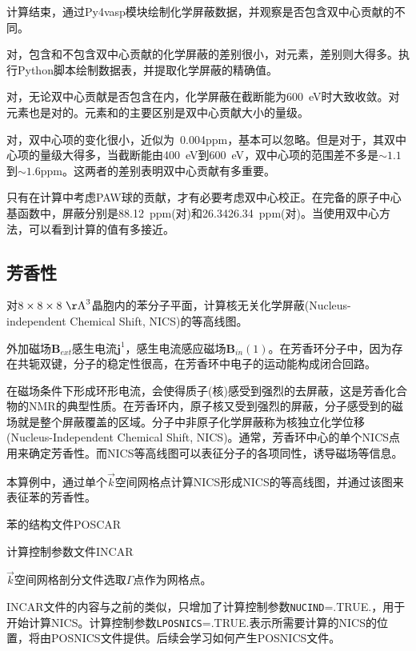 计算结束，通过\textrm{Py4vasp}模块绘制化学屏蔽数据，并观察是否包含双中心贡献的不同。

对，包含和不包含双中心贡献的化学屏蔽的差别很小，对元素，差别则大得多。执行\textrm{Python}脚本绘制数据表，并提取化学屏蔽的精确值。

对，无论双中心贡献是否包含在内，化学屏蔽在截断能为\textrm{600~eV}时大致收敛。对元素也是对的。元素和的主要区别是双中心贡献大小的量级。

对，双中心项的变化很小，近似为\textrm{~0.004ppm}，基本可以忽略。但是对于，其双中心项的量级大得多，当截断能由\textrm{400~eV}到\textrm{600~eV}，双中心项的范围差不多是$\sim1.1$到$\sim1.6\mathrm{ppm}$。这两者的差别表明双中心贡献有多重要。

只有在计算中考虑\textrm{PAW}球的贡献，才有必要考虑双中心校正。在完备的原子中心基函数中，屏蔽分别是\textrm{88.12~ppm}(对)和26.34\textrm{26.34~ppm}(对)。当使用双中心方法，可以看到计算的值有多接近。

\subsection{芳香性}
对$8\times8\times8~\mathrm{\AA}^3$晶胞内的苯分子平面，计算核无关化学屏蔽\textrm{(Nucleus-independent Chemical Shift, NICS)}的等高线图。

外加磁场$\mathbf{B}_{ext}$感生电流$\mathbf{j}^{1}$，感生电流感应磁场$\mathbf{B}_{in}{(1)}$。在芳香环分子中，因为存在共轭双键，分子的稳定性很高，在芳香环中电子的运动能构成闭合回路。

在磁场条件下形成环形电流，会使得质子(核)感受到强烈的去屏蔽，这是芳香化合物的\textrm{NMR}的典型性质。在芳香环内，原子核又受到强烈的屏蔽，分子感受到的磁场就是整个屏蔽覆盖的区域。分子中非原子化学屏蔽称为核独立化学位移\textrm{(Nucleus-Independent Chemical Shift, NICS)}。通常，芳香环中心的单个\textrm{NICS}点用来确定芳香性。而\textrm{NICS}等高线图可以表征分子的各项同性，诱导磁场等信息。

本算例中，通过单个$\vec k$空间网格点计算\textrm{NICS}形成\textrm{NICS}的等高线图，并通过该图来表征苯的芳香性。

苯的结构文件\textrm{POSCAR}

计算控制参数文件\textrm{INCAR}

$\vec k$空间网格剖分文件选取$\Gamma$点作为网格点。

\textrm{INCAR}文件的内容与之前的类似，只增加了计算控制参数\texttt{NUCIND}=\textrm{.TRUE.}，用于开始计算\textrm{NICS}。计算控制参数\texttt{LPOSNICS}=\textrm{.TRUE.}表示所需要计算的\textrm{NICS}的位置，将由\textrm{POSNICS}文件提供。后续会学习如何产生\textrm{POSNICS}文件。

